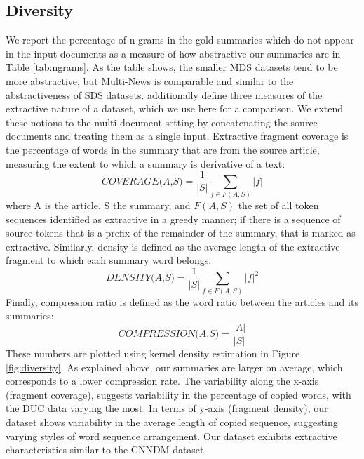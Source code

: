 \documentclass[11pt,a4paper]{article}
\begin{document}
\subsection{Diversity}  \label{diversity_section}
We report the percentage of n-grams in the gold summaries which do not appear in the input documents as a measure of how abstractive our summaries are in Table \ref{tab:ngrams}. As the table shows, the smaller MDS datasets tend to be more abstractive, but Multi-News is comparable and similar to the abstractiveness of SDS datasets.  additionally define three measures of the extractive nature of a dataset, which we use here for a comparison. We extend these notions to the multi-document setting by concatenating the source documents and treating them as a single input. Extractive fragment coverage is the percentage of words in the summary that are from the source article, measuring the extent to which a summary is derivative of a text:
\begin{equation}
    \textit{COVERAGE(A,S)} = \frac{1}{|S|}\sum_{f \in F(A,S)} |f|
\end{equation}
where A is the article, S the summary, and $F(A,S)$ the set of all token sequences identified as extractive in a greedy manner; if there is a sequence of source tokens that is a prefix of the remainder of the summary, that is marked as extractive. Similarly, density is defined as the average length of the extractive fragment to which each summary word belongs: 
\begin{equation}
    \textit{DENSITY(A,S)} = \frac{1}{|S|}\sum_{f \in F(A,S)} |f|^2
\end{equation}
Finally, compression ratio is defined as the word ratio between the articles and its summaries:
\begin{equation}
    \textit{COMPRESSION(A,S)} = \frac{|A|}{|S|}
\end{equation}
These numbers are plotted using kernel density estimation in Figure \ref{fig:diversity}. As explained above, our summaries are larger on average, which corresponds to a lower compression rate. The variability along the x-axis (fragment coverage), suggests variability in the percentage of copied words, with the DUC data varying the most. In terms of y-axis (fragment density), our dataset shows variability in the average length of copied sequence, suggesting varying styles of word sequence arrangement. Our dataset exhibits extractive characteristics similar to the CNNDM dataset. 
\end{document}
